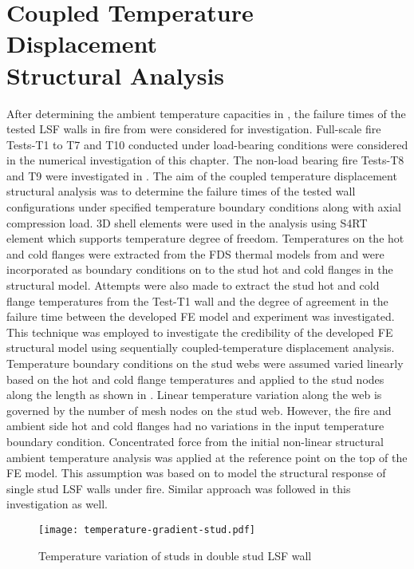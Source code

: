 \section[Coupled Temperature Displacement Structural Analysis]{Coupled Temperature Displacement \\Structural Analysis}\label{sec:temp-disp-structural}

After determining the ambient temperature capacities in , the failure times of the tested LSF walls in fire from  were considered for investigation. Full-scale fire Tests-T1 to T7 and T10 conducted under load-bearing conditions were considered in the numerical investigation of this chapter. The non-load bearing fire Tests-T8 and T9 were investigated in . The aim of the coupled temperature displacement structural analysis was to determine the failure times of the tested wall configurations under specified temperature boundary conditions along with axial compression load. 3D shell elements were used in the analysis using S4RT element which supports temperature degree of freedom. Temperatures on the hot and cold flanges were extracted from the FDS thermal models from  and were incorporated as boundary conditions on to the stud hot and cold flanges in the structural model. Attempts were also made to extract the stud hot and cold flange temperatures from the Test-T1 wall and the degree of agreement in the failure time between the developed FE model and experiment was investigated. This technique was employed to investigate the credibility of the developed FE structural model using sequentially coupled-temperature displacement analysis. Temperature boundary conditions on the stud webs were assumed varied linearly based on the hot and cold flange temperatures and applied to the stud nodes along the length as shown in . Linear temperature variation along the web is governed by the number of mesh nodes on the stud web. However, the fire and ambient side hot and cold flanges had no variations in the input temperature boundary condition. Concentrated force from the initial non-linear structural ambient temperature analysis was applied at the reference point on the top of the FE model. This assumption was based on \citet{Ariyanayagam2018b} to model the structural response of single stud LSF walls under fire. Similar approach was followed in this investigation as well.  
\begin{figure}[!htbp]
	\centering
			\texttt{[image: temperature-gradient-stud.pdf]}\\
		\caption{Temperature variation of studs in double stud LSF wall}
		\label{fig:temperature-gradient-stud}
\end{figure}

